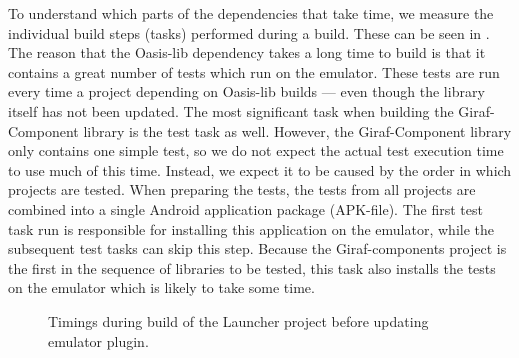 To understand which parts of the dependencies that take time, we measure the individual build steps (tasks) performed during a build. These can be seen in . The reason that the Oasis-lib dependency takes a long time to build is that it contains a great number of tests which run on the emulator. These tests are run every time a project depending on Oasis-lib builds --- even though the library itself has not been updated. The most significant task when building the Giraf-Component library is the test task as well. However, the Giraf-Component library only contains one simple test, so we do not expect the actual test execution time to use much of this time. Instead, we expect it to be caused by the order in which projects are tested. When preparing the tests, the tests from all projects are combined into a single Android application package (APK-file). The first test task run is responsible for installing this application on the emulator, while the subsequent test tasks can skip this step. Because the Giraf-components project is the first in the sequence of libraries to be tested, this task also installs the tests on the emulator which is likely to take some time.
\begin{figure}
  \centering
{}
\caption{Timings during build of the Launcher project before updating emulator plugin.}\label{fig:launcher_build_times_1}
\end{figure}

